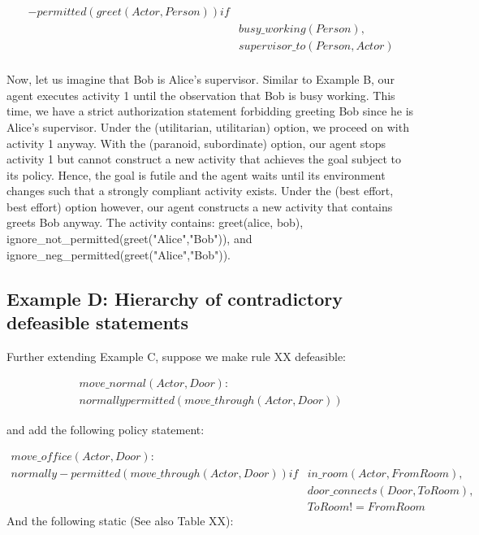 \begin{equation}
\begin{split}
-permitted(greet(Actor, Person)) if \\
    & busy\_working(Person), \\
    & supervisor\_to(Person, Actor) \\
\end{split}
\end{equation}

Now, let us imagine that Bob is Alice’s supervisor.
Similar to Example B, our agent executes activity 1 until the observation that Bob is busy working.
This time, we have a strict authorization statement forbidding greeting Bob since he is Alice’s supervisor.
Under the (utilitarian, utilitarian) option, we proceed on with activity 1 anyway.
With the (paranoid, subordinate) option, our agent stops activity 1 but cannot construct a new activity that achieves the goal subject to its policy.
Hence, the goal is futile and the agent waits until its environment changes such that a strongly compliant activity exists.
Under the (best effort, best effort) option however, our agent constructs a new activity that contains greets Bob anyway.
The activity contains: greet(alice, bob), ignore\_not\_permitted(greet("Alice","Bob")), and ignore\_neg\_permitted(greet("Alice","Bob")).

\subsection{Example D: Hierarchy of contradictory defeasible statements}

Further extending Example C, suppose we make rule XX defeasible:

\begin{equation}
\begin{split}
move\_normal(Actor, Door): \\
normally permitted(move\_through(Actor, Door))
\end{split}
\end{equation}

and add the following policy statement:

\begin{equation}
\begin{split}
move\_office(Actor, Door): \\
normally -permitted(move\_through(Actor, Door)) if
    & in\_room(Actor, FromRoom), \\
    & door\_connects(Door, ToRoom), \\
    & ToRoom != FromRoom
\end{split}
\end{equation}
And the following static (See also Table XX):

